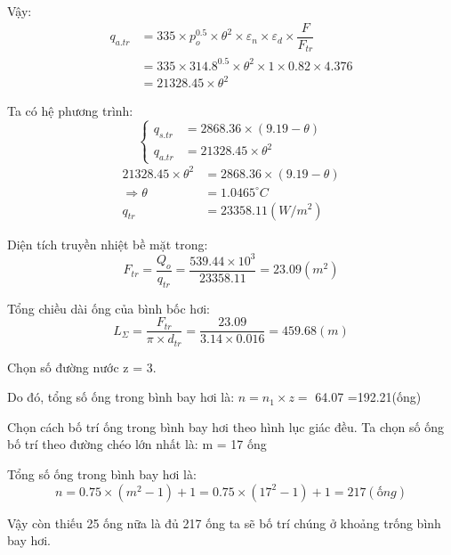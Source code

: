 Vậy:
\begin{equation*}
	\begin{split}
		q_{a.tr} &= 335\times p_{o}^{0.5}\times\theta^2\times\varepsilon_{n}\times\varepsilon_{d}\times\dfrac{F}{F_{tr}}\\
		&= 335 \times 314.8^{0.5} \times \theta^2 \times 1 \times 0.82 \times 4.376\\
		&= 21328.45 \times \theta^2
	\end{split}
\end{equation*}

Ta có hệ phương trình:
\begin{equation*}
	\begin{cases}
		q_{s.tr} &= 2868.36\times(9.19 - \theta)\\
		q_{a.tr} &= 21328.45\times\theta^2
	\end{cases}
\end{equation*}
\begin{equation*}
	\begin{split}
	21328.45\times\theta^2 &= 2868.36\times(9.19 - \theta)\\
	\Rightarrow \theta &= 1.0465^{\circ}C\\
				q_{tr} &=23358.11(W/m^2)
	\end{split}
\end{equation*}

Diện tích truyền nhiệt bề mặt trong:
\begin{equation*}
	F_{tr} = \dfrac{Q_{o}}{q_{tr}} = \dfrac{539.44 \times 10^{3}}{23358.11}=23.09(m^2)
\end{equation*}

Tổng chiều dài ống của bình bốc hơi:
\begin{equation*}
	L_{\Sigma} = \dfrac{F_{tr}}{\pi\times d_{tr}} = \dfrac{23.09}{3.14 \times 0.016}=459.68(m) 
\end{equation*}

Chọn số đường nước z = 3.

Do đó, tổng số ống trong bình bay hơi là: $n = n_{1}\times z =$ 64.07 =192.21(ống)

Chọn cách bố trí ống trong bình bay hơi theo hình lục giác đều. Ta chọn số ống bố trí theo đường chéo lớn nhất là: m = 17 ống

Tổng số ống trong bình bay hơi là:
\begin{equation*}
	n = 0.75\times(m^2 - 1) + 1 = 0.75 \times (17^2-1)+1=217(ống)
\end{equation*}

Vậy còn thiếu 25 ống nữa là đủ 217 ống ta sẽ bố trí chúng ở khoảng trống bình bay hơi.

